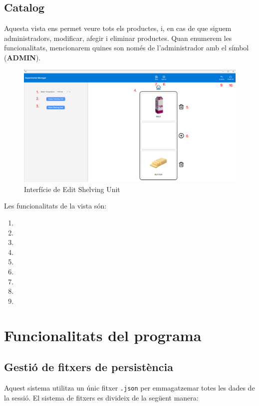 \documentclass[a4paper,12pt]{article}
\begin{document}
	\newpage
	\subsection{Catalog}
	
	Aquesta vista ens permet veure tots els productes, i, en cas de que siguem administradors, modificar, afegir i eliminar productes. Quan enumerem les funcionalitats, mencionarem quines son només de l'administrador amb el símbol (\textbf{ADMIN}).
	
	\begin{figure}[H] 
		\centering
		\includegraphics[width=0.75\linewidth]{assets/editshelvingunit.png}
		\caption{Interfície de Edit Shelving Unit}
	\end{figure}
	
	\noindent Les funcionalitats de la vista són:
	
	\begin{enumerate}[itemsep=0pt, topsep=0pt]
		\item
		\item
		\item
		\item
		\item
		\item
		\item
		\item
		\item
	\end{enumerate}
	
	
	\newpage
	\section{Funcionalitats del programa}
	
\subsection{Gestió de fitxers de persistència}

	Aquest sistema utilitza un únic fitxer \texttt{.json} per emmagatzemar totes les dades de la sessió. El sistema de fitxers es divideix de la següent manera:
	
\end{document}
